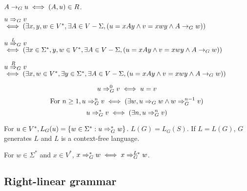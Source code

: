 \begin{definition}
$A \rightarrow_{G} u \iff (A, u) \in R$.
\end{definition}
\begin{definition}
$u \Rightarrow_{G} v$\\
$\iff (\exists x,y,w \in V^*, \exists A \in V - \Sigma,
(u = xAy \wedge v = xwy \wedge A \rightarrow_{G} w))$
\end{definition}
\begin{definition}
$u \overset{L}{\Rightarrow}_{G} v$\\
$\iff (\exists x \in \Sigma^*, y, w \in V^*, \exists A \in V - \Sigma,
(u = xAy \wedge v = xwy \wedge A \rightarrow_{G} w))$
\end{definition}
\begin{definition}
$u \overset{R}{\Rightarrow}_{G} v$\\
$\iff (\exists x, w \in V^*, \exists y \in \Sigma^*, \exists A \in V - \Sigma,
(u = xAy \wedge v = xwy \wedge A \rightarrow_{G} w))$
\end{definition}
\begin{definition}[$\gArrow{G}^n$]
\[ u \Rightarrow_{G}^0 v \iff u = v \]
\[ \textrm{For } n \ge 1, u \Rightarrow_{G}^n v \iff (\exists w, u \Rightarrow_{G} w \wedge w \Rightarrow_{G}^{n-1} v) \]
\[ u \Rightarrow_{G}^* v \iff (\exists n, u \Rightarrow_{G}^n v) \]
\end{definition}
\begin{definition}
For $u \in V^*, L_G(u) = \{w \in \Sigma^*: u \Rightarrow_{G}^* w \}$.
$L(G) = L_G(S)$.
If $L = L(G)$, $G$ generates $L$ and $L$ is a context-free language.
\end{definition}
\begin{theorem}
For $w \in \Sigma^*$ and $x \in V^*$, $x \Rightarrow_{G}^* w \iff x \Rightarrow _G^{L*} w$.
\end{theorem}

\subsection{Right-linear grammar}

